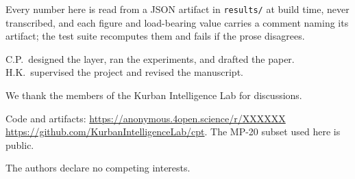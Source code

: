 \documentclass[11pt]{article}
\begin{document}
\begin{kilrepro}
Every number here is read from a JSON artifact in \texttt{results/} at build time, never
transcribed, and each figure and load-bearing value carries a comment naming its artifact;
the test suite recomputes them and fails if the prose disagrees.
\end{kilrepro}

\begin{contributions}
C.P.\ designed the layer, ran the experiments, and drafted the paper. H.K.\ supervised the
project and revised the manuscript.
\end{contributions}

\begin{acknowledgments}
We thank the members of the Kurban Intelligence Lab for discussions.
\end{acknowledgments}

\begin{availability}
Code and artifacts:
  {\url{https://anonymous.4open.science/r/XXXXXX}}
  {\url{https://github.com/KurbanIntelligenceLab/cpt}}.
The MP-20 subset used here is public.
\end{availability}

\begin{conflicts}
The authors declare no competing interests.
\end{conflicts}




\appendix

\end{document}
